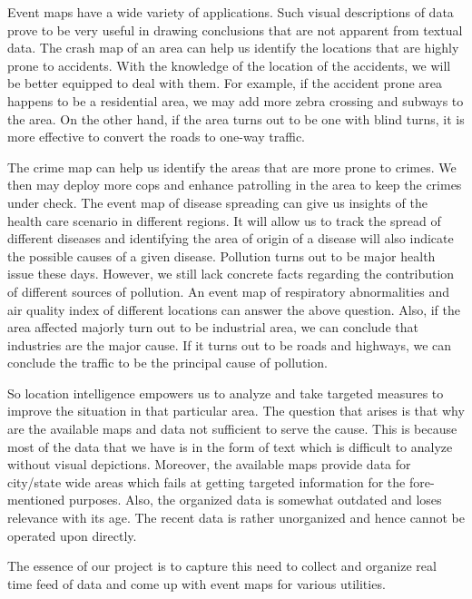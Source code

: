 \documentclass[a4paper,11pt]{article}
\begin{document}
\vspace{\baselineskip}
Event maps have a wide variety of applications. Such visual descriptions of data prove to be very useful in drawing conclusions that are not apparent from textual data. The crash map of an area can help us identify the locations that are highly prone to accidents. With the knowledge of the location of the accidents, we will be better equipped to deal with them. For example, if the accident prone area happens to be a residential area, we may add more zebra crossing and subways to the area. On the other hand, if the area turns out to be one with blind turns, it is more effective to convert the roads to one-way traffic.

\vspace{\baselineskip}
The crime map can help us identify the areas that are more prone to crimes. We then may deploy more cops and enhance patrolling in the area to keep the crimes under check. The event map of disease spreading can give us insights of the health care scenario in different regions. It will allow us to track the spread of different diseases and identifying the area of origin of a disease will also indicate the possible causes of a given disease. Pollution turns out to be major health issue these days. However, we still lack concrete facts regarding the contribution of different sources of pollution. An event map of respiratory abnormalities and air quality index of different locations can answer the above question. Also, if the area affected majorly turn out to be industrial area, we can conclude that industries are the major cause. If it turns out to be roads and highways, we can conclude the traffic to be the principal cause of pollution.

\vspace{\baselineskip}
So location intelligence empowers us to analyze and take targeted measures to improve the situation in that particular area. The question that arises is that why are the available maps and data not sufficient to serve the cause. This is because most of the data that we have is in the form of text which is difficult to analyze without visual depictions. Moreover, the available maps provide data for city/state wide areas which fails at getting targeted information for the fore-mentioned purposes. Also, the organized data is somewhat outdated and loses relevance with its age. The recent data is rather unorganized and hence cannot be operated upon directly.

\vspace{\baselineskip}
The essence of our project is to capture this need to collect and organize real time feed of data and come up with event maps for various utilities.
\end{document}
